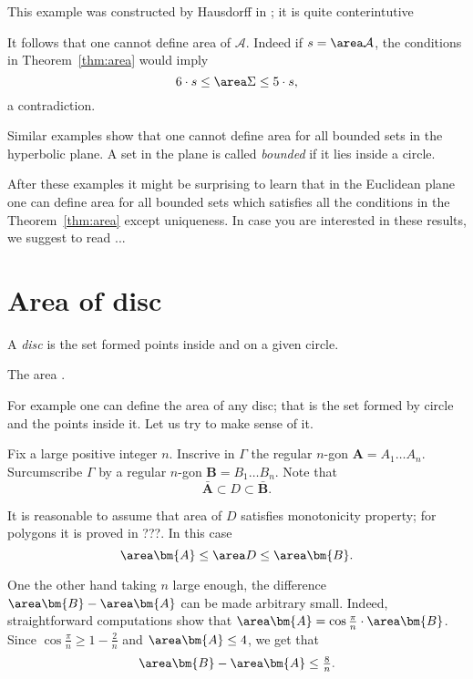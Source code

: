 {This example was constructed by Hausdorff in \cite{hausdorff};
it is quite conterintutive 

It follows that one cannot define area of $\mathcal{A}$.
Indeed if $s=\area\mathcal{A}$,
the conditions in Theorem~\ref{thm:area} would imply 
\[6\cdot s\le \area \Sigma\le 5\cdot s,\]
a contradiction. 


Similar examples show that one cannot define area for all bounded sets in the hyperbolic plane.
A set in the plane is called \emph{bounded} if it lies inside a circle.

After these examples it might be surprising to learn that
in the Euclidean plane one can define area for all bounded sets
which satisfies all the conditions in the Theorem~\ref{thm:area} except uniqueness.
In case you are interested in these results, we suggest to read ...


















\section*{Area of disc}

A \emph{disc} is the set 
formed points inside and on a given circle.

The area .

For example one can define the area of any disc;
that is the set formed by circle and the points inside it.
Let us try to make sense of it.

Fix a large positive integer $n$.
Inscrive in $\Gamma$ the regular $n$-gon $\bm{A}=A_1\dots A_n$.
Surcumscribe $\Gamma$ by a regular $n$-gon $\bm{B}=B_1\dots B_n$.
Note that 
\[\bar{\bm{A}}\subset D\subset\bar{\bm{B}}.\]

It is reasonable to assume that area of $D$ satisfies monotonicity property;
for polygons it is proved in ???.
In this case 
\[\area\bm{A}\le\area D\le \area\bm{B}.\]

One the other hand taking $n$ large enough, 
the difference $\area\bm{B}-\area\bm{A}$ can be made arbitrary small.
Indeed, straightforward computations show that
$\area\bm{A}=\cos\tfrac\pi n\cdot\area\bm{B}$. 
Since $\cos\tfrac\pi n\ge 1-\tfrac2n $ and $\area \bm{A}\le 4$,
we get that
\[\area\bm{B}-\area\bm{A}\le \tfrac8n.\]










}
